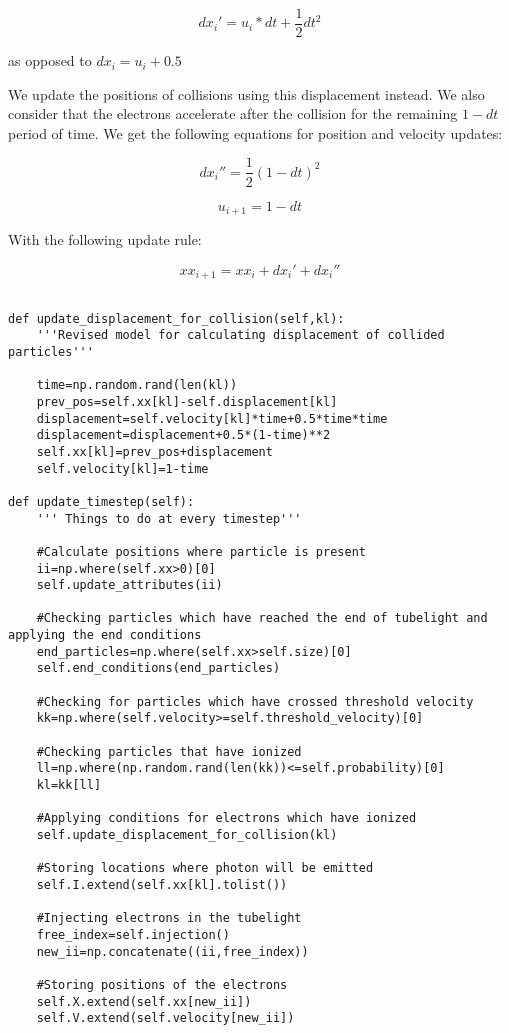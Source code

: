 \documentclass{article}
\begin{document}
\[dx_i' = u_i*dt + \frac{1}{2}dt^2\]

as opposed to \(dx_i = u_i + 0.5\)

We update the positions of collisions using this displacement instead.
We also consider that the electrons accelerate after the collision for
the remaining \(1-dt\) period of time. We get the following equations
for position and velocity updates:

\[dx_i'' = \frac{1}{2}(1-dt)^2\]

\[u_{i+1} = 1-dt\]

With the following update rule:

\[xx_{i+1} = xx_i + dx_i' + dx_i''\]

\begin{lstlisting}

def update_displacement_for_collision(self,kl):
    '''Revised model for calculating displacement of collided particles'''  

    time=np.random.rand(len(kl))
    prev_pos=self.xx[kl]-self.displacement[kl]
    displacement=self.velocity[kl]*time+0.5*time*time
    displacement=displacement+0.5*(1-time)**2
    self.xx[kl]=prev_pos+displacement
    self.velocity[kl]=1-time

def update_timestep(self):
    ''' Things to do at every timestep'''

    #Calculate positions where particle is present
    ii=np.where(self.xx>0)[0]
    self.update_attributes(ii)
    
    #Checking particles which have reached the end of tubelight and applying the end conditions
    end_particles=np.where(self.xx>self.size)[0]
    self.end_conditions(end_particles)
    
    #Checking for particles which have crossed threshold velocity
    kk=np.where(self.velocity>=self.threshold_velocity)[0]
    
    #Checking particles that have ionized
    ll=np.where(np.random.rand(len(kk))<=self.probability)[0]
    kl=kk[ll]
    
    #Applying conditions for electrons which have ionized 
    self.update_displacement_for_collision(kl)

    #Storing locations where photon will be emitted
    self.I.extend(self.xx[kl].tolist())

    #Injecting electrons in the tubelight
    free_index=self.injection()
    new_ii=np.concatenate((ii,free_index))

    #Storing positions of the electrons
    self.X.extend(self.xx[new_ii])
    self.V.extend(self.velocity[new_ii])
\end{lstlisting}
\end{document}
